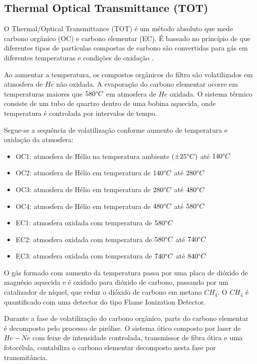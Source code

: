 \subsection{Thermal Optical Transmittance (TOT)}

O Thermal/Optical Transmittance (TOT) é um método absoluto
que mede carbono orgânico (OC) e carbono elementar (EC).
É baseado no princípio  de que diferentes tipos de partículas
compostas de carbono são convertidas para gás em diferentes temperaturas e
condições de oxidação \citep{birch1998}.

Ao aumentar a temperatura, os compostos orgânicos do filtro são volatilizados 
em atmosfera de $He$ não oxidada.
A evaporação do carbono elementar ocorre em temperaturas maiores que 
$580 \degree C$ em atmosfera de $He$ oxidada.
O sistema térmico consiste de um tubo de quartzo dentro de uma bobina aquecida, 
onde temperatura é controlada por intervalos de tempo.  

Segue-se a sequência de volatilização conforme aumento de temperatura e 
oxidação da atmosfera:

\begin{itemize}
  \item OC1: atmosfera de Hélio na temperatura ambiente $(\pm 25 \degree C)$ até $140 \degree C$
  \item OC2: atmosfera de Hélio em temperatura de $140 \degree C$ até $280 \degree C$
  \item OC3: atmosfera de Hélio em temperatura de $280 \degree C$ até $480 \degree C$
  \item OC4: atmosfera de Hélio em temperatura de $480 \degree C$ até $580 \degree C$
  \item EC1: atmosfera oxidada com temperatura de $580 \degree C$
  \item EC2: atmosfera oxidada com temperatura de $580 \degree C$ até $740 \degree C$
  \item EC3: atmosfera oxidada com temperatura de $740 \degree C$ até $840 \degree C$
\end{itemize}

O gás formado com aumento da temperatura passa por uma placa de dióxido de magnésio 
aquecida e é oxidado para dióxido de carbono, passando por um catalizador de níquel, 
que reduz o dióxido de carbono em metano $CH_4$.
O $CH_4$ é quantificado com uma detector do tipo 
Flame Ionization Detector.

Durante a fase de volatilização do carbono orgânico, parte do carbono elementar
é decomposto pelo processo de pirólise. 
O sistema ótico composto por laser de $He-Ne$ com feixe de intensidade controlada, 
transmissor de fibra ótica e uma fotocélula, contabiliza o carbono elementar
decomposto nesta fase por transmitância.

